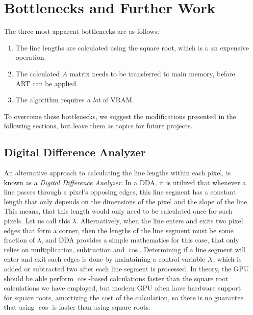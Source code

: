 \section{Bottlenecks and Further Work}\label{sec:futwork}
The three most apparent bottlenecks are as follows:
\begin{enumerate}
    \item The line lengths are calculated using the square root, which is a an expensive operation.
    \item The calculated $A$ matrix needs to be transferred to main memory, before ART can be applied. 
    \item The algorithm requires \textit{a lot} of VRAM.
\end{enumerate}
To overcome these bottlenecks, we suggest the modifications presented in the following sections, but leave them as topics for future projects.

\subsection{Digital Difference Analyzer}
An alternative approach to calculating the line lengths within each pixel, is known as a \textit{Digital Difference Analyzer}\cite[p.~63-65]{FCT}. In a DDA, it is utilized that whenever a line passes through a pixel's opposing edges, this line segment has a constant length that only depends on the dimensions of the pixel and the slope of the line. 
This means, that this length would only need to be calculated once for such pixels. Let us call this $\lambda$.
Alternatively, when the line enters and exits two pixel edges that form a corner, then the lengths of the line segment must be some fraction of $\lambda$, and DDA provides a simple mathematics for this case, that only relies on multiplication, subtraction and $\cos$. Determining if a line segment will enter and exit such edges is done by maintaining a control variable $X$, which is added or subtracted two after each line segment is processed. In theory, the GPU should be able perform $\cos$-based calculations faster than the square root calculations we have employed, but modern GPU often have hardware support for square roots, amortizing the cost of the calculation, so there is no guarantee that using $\cos$ is faster than using square roots\cite{SUPERCOMPUTING}.

